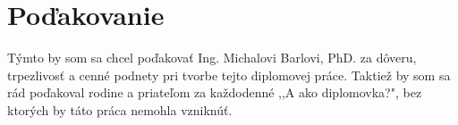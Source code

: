 \vspace*{\fill}
\section*{Poďakovanie}
Týmto by som sa chcel poďakovať Ing. Michalovi Barlovi, PhD. za dôveru, trpezlivosť a cenné podnety pri tvorbe tejto diplomovej práce. Taktiež by som sa rád poďakoval rodine a priateľom za každodenné ,,A ako diplomovka?", bez ktorých by táto práca nemohla vzniknúť.
